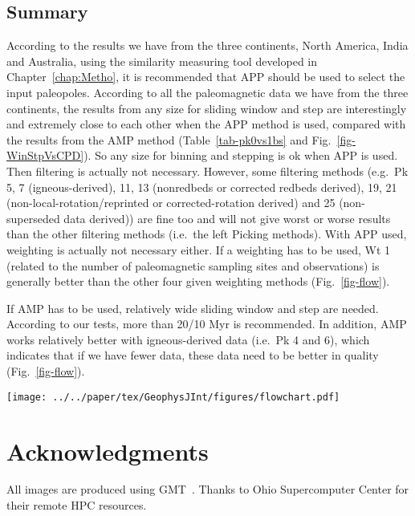 \subsection{Summary}

According to the results we have from the three continents, North America, India
and Australia, using the similarity measuring tool developed in Chapter~\ref{chap:Metho}, it is
recommended that APP should be used to select the input paleopoles. According to
all the paleomagnetic data we have from the three continents, the results from
any size for sliding window and step are interestingly and extremely close to
each other when the APP method is used, compared with the results from the AMP
method (Table~\ref{tab-pk0vs1bs} and Fig.~\ref{fig-WinStpVsCPD}). So any size
for binning and stepping is ok when APP is used. Then filtering is actually not
necessary. However, some filtering methods (e.g.\ Pk 5, 7 (igneous-derived), 11,
13 (nonredbeds or corrected redbeds derived), 19, 21
(non-local-rotation/reprinted or corrected-rotation derived) and 25
(non-superseded data derived)) are fine too and will not give worst or worse
results than the other filtering methods (i.e.\ the left Picking methods). With
APP used, weighting is actually not necessary either. If a weighting has to be
used, Wt 1 (related to the number of paleomagnetic sampling sites and
observations) is generally better than the other four given weighting methods
(Fig.~\ref{fig-flow}).

If AMP has to be used, relatively wide sliding window and step are needed.
According to our tests, more than 20/10 Myr is recommended. In addition, AMP
works relatively better with igneous-derived data (i.e.\ Pk 4 and 6),
which indicates that if we have fewer data, these data need to be better in
quality (Fig.~\ref{fig-flow}).

\begin{figure*}
  \centering
  \texttt{[image: ../../paper/tex/GeophysJInt/figures/flowchart.pdf]}
  \caption[Flowchart of making a reliable paleomagnetic APWP]{Flowchart for
recommended procedure of processing paleomagnetic data.}\label{fig-flow}
\end{figure*}

\section*{Acknowledgments}
All images are produced using GMT~\citep{W13}. Thanks to Ohio Supercomputer
Center for their remote HPC resources.
